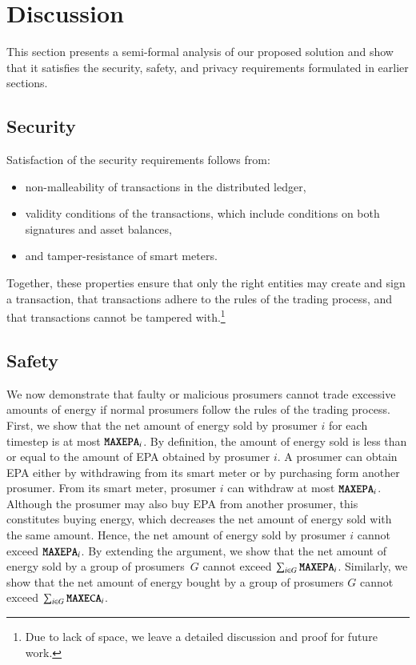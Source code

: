 \section{Discussion}
\label{sec:discussion}

This section presents a semi-formal analysis of our proposed solution
and show that it satisfies the security, safety, and privacy
requirements formulated in earlier sections.

\subsection{Security}
Satisfaction of the security requirements follows from:
\begin{itemize}[noitemsep,topsep=-\parskip]
\item non-malleability of transactions in the distributed ledger,
\item validity conditions of the transactions, which include conditions on both signatures and asset balances,
\item and tamper-resistance of smart meters.
\end{itemize}
Together, these properties ensure that only the right entities may
create and sign a transaction, that transactions adhere to the rules
of the trading process, and that transactions cannot be tampered
with.\footnote{Due to lack of space, we leave a detailed discussion
  and proof for future work.}

\subsection{Safety}
We now demonstrate that faulty or malicious prosumers cannot trade
excessive amounts of energy if normal prosumers follow the rules of
the trading process.
%
First, we show that the net amount of energy sold by prosumer $i$ for
each timestep is at most $\texttt{MAXEPA}_i$.  By definition, the
amount of energy sold is less than or equal to the amount of EPA
obtained by prosumer $i$.  A prosumer can obtain EPA either by
withdrawing from its smart meter or by purchasing form another
prosumer.  From its smart meter, prosumer $i$ can withdraw at most
$\texttt{MAXEPA}_i$.
Although the prosumer may also buy EPA from another prosumer, this
constitutes buying energy, which decreases the net amount of energy
sold with the same amount.
Hence, the net amount of energy sold by prosumer $i$ cannot exceed
$\texttt{MAXEPA}_i$.  By extending the argument, we show that the net
amount of energy sold by a group of prosumers~$G$ cannot exceed
$\sum_{i \in G} \texttt{MAXEPA}_i$.  Similarly, we show that the net
amount of energy bought by a group of prosumers $G$ cannot exceed
$\sum_{i \in G} \texttt{MAXECA}_i$.


